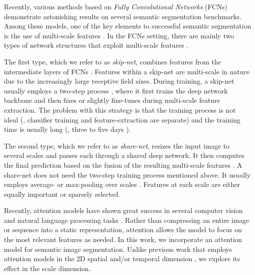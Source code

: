 Recently, various methods  \cite{chen2014semantic, dai2015boxsup, liu2015semantic, noh2015learning, zheng2015conditional, lin2015efficient} based on {\it Fully Convolutional Networks} (FCNs) \cite{long2014fully} demonstrate astonishing results on several semantic segmentation benchmarks. Among these models, one of the key elements to successful semantic segmentation is the use of multi-scale features \cite{farabet2013learning, pinheiro2013recurrent, hariharan2014hypercolumns, long2014fully, mostajabi2014feedforward, lin2015efficient}. In the FCNs setting, there are mainly two types of network structures that exploit multi-scale features \cite{xie2015holistically}. 

The first type, which we refer to as {\it skip-net}, combines features from the intermediate layers of FCNs \cite{hariharan2014hypercolumns, long2014fully, mostajabi2014feedforward, chen2014semantic}.  Features within a skip-net are multi-scale in nature due to the increasingly large receptive field sizes. During training, a skip-net usually employs a two-step process \cite{hariharan2014hypercolumns, long2014fully, mostajabi2014feedforward, chen2014semantic}, where it first trains the deep network backbone and then fixes or slightly fine-tunes during multi-scale feature extraction. The problem with this strategy is that the training process is not ideal (\ie, classifier training and feature-extraction are separate) and the training time is usually long (\eg, three to five days \cite{long2014fully}).

The second type, which we refer to as {\it share-net}, resizes the input image to several scales and passes each through a shared deep network. It then computes the final prediction based on the fusion of the resulting multi-scale features \cite{farabet2013learning, lin2015efficient}. A share-net does not need the two-step training process mentioned above. It usually employs average- or max-pooling over scales \cite{felzenszwalb2010object, ciresan2012multi, papandreou2014untangling, dai2015boxsup}. Features at each scale are either equally important or sparsely selected.

Recently, attention models have shown great success in several computer vision and natural language processing tasks \cite{bahdanau2014neural, mnih2014recurrent, xu2015show, chen2015abc}. Rather than compressing an entire image or sequence into a static representation, attention allows the model to focus on the most relevant features as needed. 
In this work, we incorporate an attention model for semantic image segmentation.
Unlike previous work that employs attention models in the 2D spatial and/or temporal dimension \cite{sharma2015action, yao2015describing}, we explore its effect in the scale dimension.

